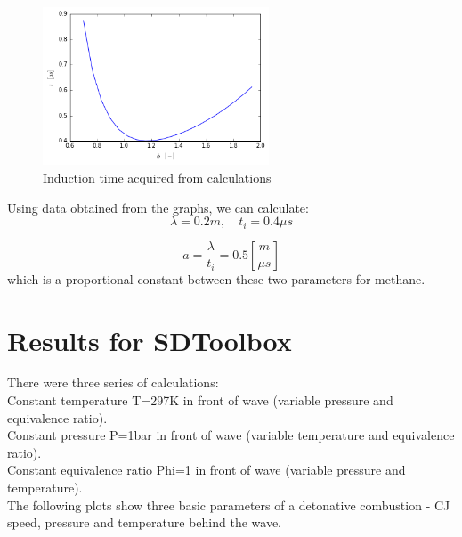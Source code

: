 \documentclass[11pt,a4paper]{article}
\begin{document}
\begin{figure}[h]
    \centering
    \includegraphics[width=0.6\textwidth]{wykres}
    \caption{Induction time acquired from calculations}
    \label{fig:B}
\end{figure}
Using data obtained from the graphs, we can calculate:\\
\begin{equation}
\lambda = 0.2m, \quad t_i = 0.4 \mu s
\end{equation}

\begin{equation}
	a= \frac{\lambda}{t_i} = 0.5 \left[ \frac{m}{\mu s} \right]
\end{equation}
which is a proportional constant between these two parameters for methane.\\


\section{Results for SDToolbox}\label{sec:results}
There were three series of calculations:\\
Constant temperature T=297K in front of wave (variable pressure and equivalence ratio).\\
Constant pressure P=1bar in front of wave (variable temperature and equivalence ratio).\\
Constant equivalence ratio Phi=1 in front of wave (variable pressure and temperature).\\
The following plots show three basic parameters of a detonative combustion - CJ speed, pressure and temperature behind the wave.\\
\end{document}
